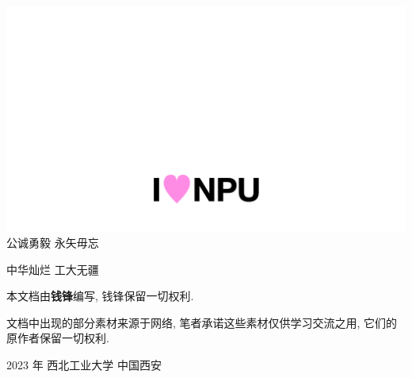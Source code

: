 \newpage
\thispagestyle{empty}
\vspace*{5cm}
\begin{center}
    \includegraphics*[width=\textwidth]{../pic/i_love_npu.jpeg}
    \large
    公诚勇毅 \quad 永矢毋忘

    中华灿烂 \quad 工大无疆
\end{center}
\vspace*{13em}
\begin{center}
    \small
    本文档由\textbf{钱锋}编写, 钱锋保留一切权利.

    文档中出现的部分素材来源于网络, 笔者承诺这些素材仅供学习交流之用, 
    它们的原作者保留一切权利.

    2023 年 \quad 西北工业大学 \quad 中国西安 
\end{center}